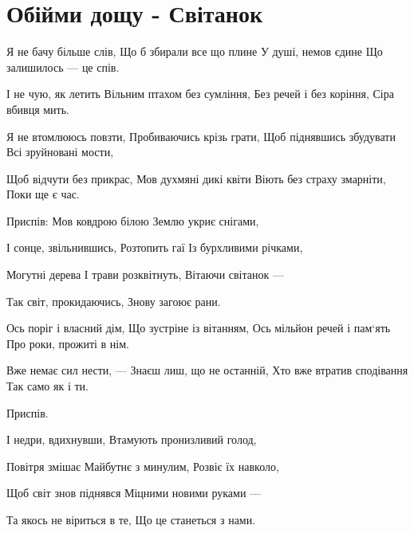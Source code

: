 \section{Обійми дощу - Світанок}
\begin{guitar}
Я не бачу більше слів,
Що б збирали все що плине
У душі, немов єдине
Що залишилось — це спів.

І не чую, як летить
Вільним птахом без сумління,
Без речей і без коріння,
Сіра вбивця мить.

Я не втомлююсь повзти,
Пробиваючись крізь грати,
Щоб піднявшись збудувати
Всі зруйновані мости,

Щоб відчути без прикрас,
Мов духмяні дикі квіти
Віють без страху змарніти,
Поки ще є час.

Приспів:
Мов ковдрою білою
Землю укриє снігами,

І сонце, звільнившись,
Розтопить гаї
Із бурхливими річками,

Могутні дерева
І трави розквітнуть,
Вітаючи світанок —

Так світ, прокидаючись,
Знову загоює рани.

Ось поріг і власний дім,
Що зустріне із вітанням,
Ось мільйон речей і пам‘ять
Про роки, прожиті в нім.

Вже немає сил нести, —
Знаєш лиш, що не останній,
Хто вже втратив сподівання
Так само як і ти.

Приспів.

І недри, вдихнувши,
Втамують пронизливий голод,

Повітря змішає
Майбутнє з минулим,
Розвіє їх навколо,

Щоб світ знов піднявся
Міцними новими руками —

Та якось не віриться в те,
Що це станеться з нами.
\end{guitar}